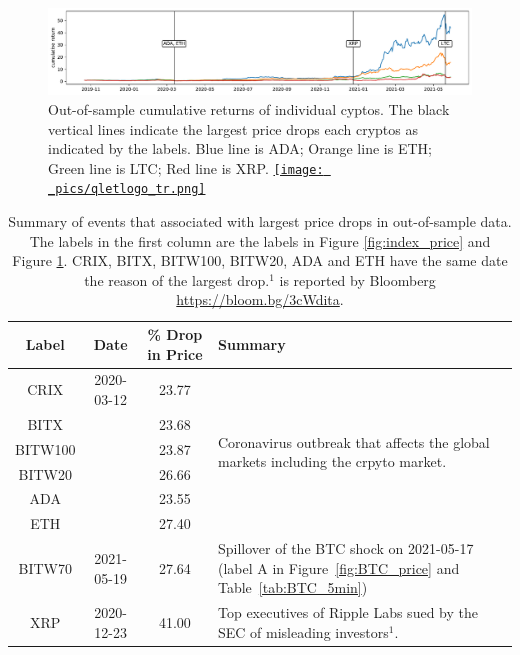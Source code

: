 \documentclass[11pt,a4paper,english]{article}
\begin{document}
\begin{figure}[t]
\includegraphics[width=\textwidth]{_pics/individualCoins_price.pdf}
  \caption{Out-of-sample cumulative returns of individual cyptos.
  The black vertical lines indicate the largest price drops each
  cryptos as indicated by the labels.
    \textcolor{plt1}{Blue line} is ADA;
  \textcolor{plt2}{Orange line} is ETH;
  \textcolor{plt3}{Green line} is LTC;
  \textcolor{plt4}{Red line} is XRP.
  \href{https://github.com/QuantLet/Hedging-Cryptos-with-Bitcoin-Futures/blob/main/newToQuantlet/Pynotebooks/figures/Figure 3_4_5.ipynb}{\texttt{[image: \_pics/qletlogo\_tr.png]}} }
  \label{fig:individualCoins_price}
\end{figure}

\begin{table}[t]
    \centering
      \begin{tabularx}{.8\textwidth}{cccX}
        \toprule
        Label &  Date & \% Drop in Price &  Summary\\
        \midrule
        CRIX    &2020-03-12 & 23.77 &
        \multirow[t]{6}{\hsize}{Coronavirus outbreak that affects the
          global markets including the crpyto market.}\\ 
        BITX    & & 23.68 &  \\
        BITW100 & & 23.87 &  \\
        BITW20  & & 26.66 &  \\
        ADA     & & 23.55 &  \\
        ETH     & & 27.40 &  \\
        BITW70  & 2021-05-19 & 27.64 & Spillover of the BTC shock on
        2021-05-17 (label A in Figure~\ref{fig:BTC_price} and
        Table~\ref{tab:BTC_5min})\\ 
        XRP     & 2020-12-23 & 41.00 & Top executives of Ripple Labs
        sued by the SEC of misleading investors$^1$. \\ 
        \bottomrule
      \end{tabularx}
        \caption{Summary of events that associated with largest price drops in out-of-sample data.
        The labels in the first column are the labels in Figure \ref{fig:index_price} and Figure \ref{fig:individualCoins_price}.
        CRIX, BITX, BITW100, BITW20, ADA and ETH have the same date
        the reason of the largest drop.$^1$ is reported by Bloomberg
        \url{https://bloom.bg/3cWdita}.} 
        \label{tab:All_min}
  \end{table}
\clearpage
\newpage
\end{document}
